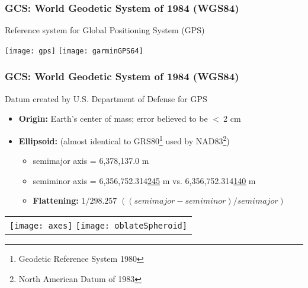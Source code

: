 \documentclass[t]{beamer} %
\begin{document}

\begin{frame}
\frametitle{GCS: World Geodetic System of 1984 (WGS84)}
Reference system for Global Positioning System (GPS)

\texttt{[image: gps]}  \hspace{0.3in}
\texttt{[image: garminGPS64]}
\end{frame}


\begin{frame}
\frametitle{GCS: World Geodetic System of 1984 (WGS84)}

Datum created by U.S. Department of Defense for GPS\\
\begin{itemize}
\item \textbf{Origin:} Earth's center of mass; error believed to be $<\ $2 cm  %
\item \textbf{Ellipsoid:} (almost identical to GRS80\footnote{Geodetic Reference System 1980} used by NAD83\footnote{North American Datum of 1983})
\begin{itemize}
	\item semimajor axis = 6,378,137.0 m
	\item semiminor axis = 6,356,752.314\underline{245} m vs. 6,356,752.314\underline{140} m
	\item \textbf{Flattening:} $1/298.257$  $((semimajor - semiminor)/semimajor)$
\end{itemize}
\end{itemize}
\vspace{-0.1in}
\begin{table}
\begin{tabular}{l}
\texttt{[image: axes]} \hspace{.5in}
\texttt{[image: oblateSpheroid]}
\end{tabular}
\end{table}
\end{frame}

\end{document}
